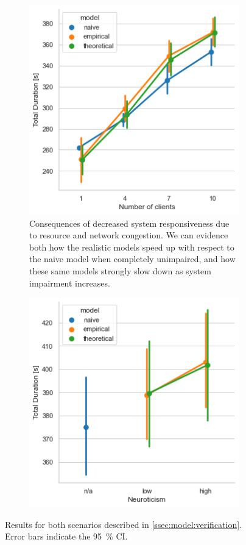 \begin{figure}
    \centering
    \begin{subfigure}[t]{\columnwidth}
        \centering
        \includegraphics[width=.8\textwidth]{figs/numclients_vs_duration.png}
        \caption{
            Consequences of decreased system responsiveness due to resource and network congestion.
            We can evidence both how the realistic models speed up with respect to the naive model when completely unimpaired, and how these same models strongly slow down as system impairment increases.
        }\label{fig:scaling_duration}
    \end{subfigure}%
    \hspace{\fill}%
    \begin{subfigure}[t]{\columnwidth}
        \centering
        \includegraphics[width=.8\textwidth]{figs/neuroticism_vs_duration.png}
        \caption{}\label{fig:neuro_duration}
    \end{subfigure}%
    \caption{Results for both scenarios described in \cref{ssec:model:verification}. Error bars indicate the \SI{95}{\percent} \ac{CI}.}
\end{figure}

